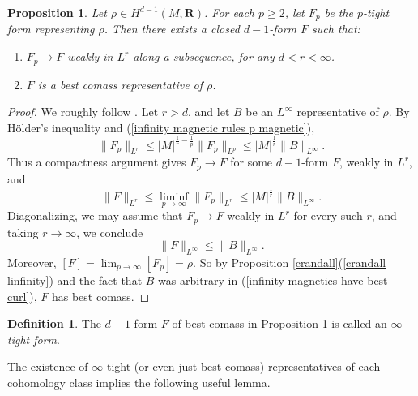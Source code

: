 \documentclass[reqno,11pt]{amsart}
\newcommand{\RR}{\mathbf{R}}
\newcommand{\dfn}[1]{\emph{#1}\index{#1}}
\newtheorem{proposition}[theorem]{Proposition}
\theoremstyle{definition}
\newtheorem{definition}[theorem]{Definition}
\numberwithin{equation}{section}
\begin{document}
\begin{proposition}\label{existence infinity}
Let $\rho \in H^{d - 1}(M, \RR)$.
For each $p \geq 2$, let $F_p$ be the $p$-tight form representing $\rho$. Then there exists a closed $d - 1$-form $F$ such that:
\begin{enumerate}
\item $F_p \to F$ weakly in $L^r$ along a subsequence, for any $d < r < \infty$.
\item $F$ is a best comass representative of $\rho$.
\end{enumerate}
\end{proposition}
\begin{proof}
We roughly follow \cite[\S3]{Lindqvist14}.
Let $r > d$, and let $B$ be an $L^\infty$ representative of $\rho$.
By H\"older's inequality and (\ref{infinity magnetic rules p magnetic}),
\begin{equation}\label{uniform bounds in p by best curl}
	\|F_p\|_{L^r} \leq |M|^{\frac{1}{r} - \frac{1}{p}} \|F_p\|_{L^p} \leq |M|^{\frac{1}{r}} \|B\|_{L^\infty}.
\end{equation}
Thus a compactness argument gives $F_p \to F$ for some $d - 1$-form $F$, weakly in $L^r$, and 
$$\|F\|_{L^r} \leq \liminf_{p \to \infty} \|F_p\|_{L^r} \leq |M|^{\frac{1}{r}} \|B\|_{L^\infty}.$$
Diagonalizing, we may assume that $F_p \to F$ weakly in $L^r$ for every such $r$, and taking $r \to \infty$, we conclude 
\begin{equation}\label{infinity magnetics have best curl}
	\|F\|_{L^\infty} \leq \|B\|_{L^\infty}.
\end{equation}
Moreover, $[F] = \lim_{p \to \infty} [F_p] = \rho$.
So by Proposition \ref{crandall}(\ref{crandall linfinity}) and the fact that $B$ was arbitrary in (\ref{infinity magnetics have best curl}), $F$ has best comass.
\end{proof}

\begin{definition}
The $d - 1$-form $F$ of best comass in Proposition \ref{existence infinity} is called an \dfn{$\infty$-tight form}.
\end{definition}

The existence of $\infty$-tight (or even just best comass) representatives of each cohomology class implies the following useful lemma.
\end{document}

